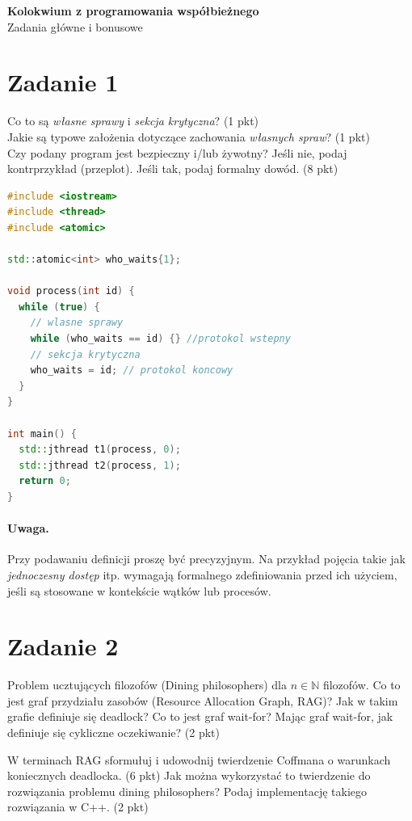 \documentclass[12pt,a4paper]{article}
\begin{document}
	
	\begin{center}
		{\Large \textbf{Kolokwium z programowania współbieżnego}}\\[2mm]
		{\large Zadania główne i bonusowe}
	\end{center}
	
	
	\section*{Zadanie 1}
	{Co to są \emph{własne sprawy} i \emph{sekcja krytyczna}?} (1 pkt)\\
	{Jakie są typowe założenia dotyczące zachowania \emph{własnych spraw}?} (1 pkt)\\
	{Czy podany program jest bezpieczny i/lub żywotny?} Jeśli nie, podaj kontrprzykład (przeplot). Jeśli tak, podaj formalny dowód. (8 pkt)
	
	\begin{lstlisting}[language=C++]
#include <iostream>
#include <thread>
#include <atomic>

std::atomic<int> who_waits{1};

void process(int id) {
  while (true) {
    // wlasne sprawy
    while (who_waits == id) {} //protokol wstepny
    // sekcja krytyczna
    who_waits = id; // protokol koncowy
  }
}

int main() {
  std::jthread t1(process, 0);
  std::jthread t2(process, 1);
  return 0;
}
	\end{lstlisting}
	
	\paragraph{Uwaga.}
	Przy podawaniu definicji proszę być precyzyjnym. Na przykład pojęcia takie jak \emph{jednoczesny dostęp} itp. wymagają formalnego zdefiniowania przed ich użyciem, jeśli są stosowane w kontekście wątków lub procesów.
	
	\section*{Zadanie 2}
	{Problem ucztujących filozofów (Dining philosophers) dla $n \in \mathbb{N}$ filozofów. Co to jest graf przydziału zasobów
		(Resource Allocation Graph, RAG)? Jak w takim grafie definiuje się deadlock? Co to jest graf wait-for? Mając graf wait-for, jak definiuje się cykliczne oczekiwanie?}
	(2 pkt)
	
	{ W terminach RAG sformułuj i udowodnij twierdzenie Coffmana o warunkach koniecznych deadlocka.  (6 pkt) Jak można wykorzystać to twierdzenie do rozwiązania problemu dining philosophers? Podaj implementację takiego rozwiązania w C++.}
	(2 pkt)
	
\end{document}
